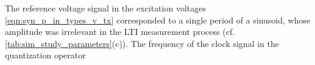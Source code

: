 %
The reference voltage signal in
the excitation voltages
\eqref{eqn:syn_p_in_types_v_tx} corresponded to
a single period of
a sinusoid, whose amplitude was
irrelevant in
the \ac{LTI} measurement process
(cf. \cref{tab:sim_study_parameters}(c)).
The frequency of
the clock signal in
the quantization operator
